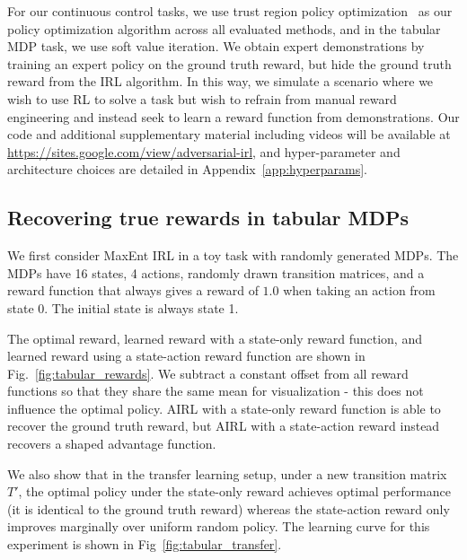 \documentclass{article} \usepackage{iclr2018_conference,times}
\begin{document}
For our continuous control tasks, we use trust region policy optimization~\citep{Schulman15} as our policy optimization algorithm across all evaluated methods, and in the tabular MDP task, we use soft value iteration. We obtain expert demonstrations by training an expert policy on the ground truth reward, but hide the ground truth reward from the IRL algorithm. In this way, we simulate a scenario where we wish to use RL to solve a task but wish to refrain from manual reward engineering and instead seek to learn a reward function from demonstrations. Our code and additional supplementary material including videos will be available at \url{https://sites.google.com/view/adversarial-irl}, and hyper-parameter and architecture choices are detailed in Appendix~\ref{app:hyperparams}.

\subsection{Recovering true rewards in tabular MDPs}

We first consider MaxEnt IRL in a toy task with randomly generated MDPs. The MDPs have 16 states, 4 actions, randomly drawn transition matrices, and a reward function that always gives a reward of $1.0$ when taking an action from state 0. The initial state is always state 1.

The optimal reward, learned reward with a state-only reward function, and learned reward using a state-action reward function are shown in Fig.~\ref{fig:tabular_rewards}. We subtract a constant offset from all reward functions so that they share the same mean for visualization - this does not influence the optimal policy. AIRL with a state-only reward function is able to recover the ground truth reward, but AIRL with a state-action reward instead recovers a shaped advantage function.

We also show that in the transfer learning setup, under a new transition matrix $T'$, the optimal policy under the state-only reward achieves optimal performance (it is identical to the ground truth reward) whereas the state-action reward only improves marginally over uniform random policy. The learning curve for this experiment is shown in Fig~\ref{fig:tabular_transfer}.
\end{document}
